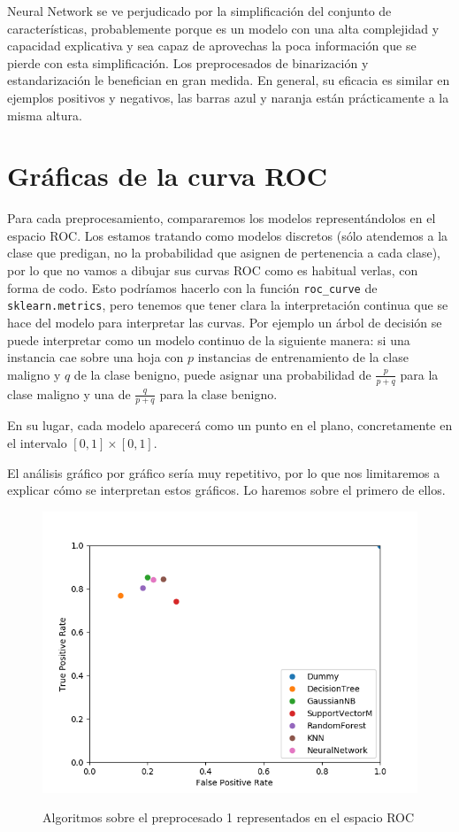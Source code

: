 \documentclass[oneside]{book}
\begin{document}
Neural Network se ve perjudicado por la simplificación del conjunto de
características, probablemente porque es un modelo con una alta
complejidad y capacidad explicativa y sea capaz de aprovechas la poca
información que se pierde con esta simplificación. Los preprocesados
de binarización y estandarización le benefician en gran medida. En
general, su eficacia es similar en ejemplos positivos y negativos, las barras azul y naranja están prácticamente a la misma altura.

\section{Gráficas de la curva ROC}

Para cada preprocesamiento, compararemos los modelos representándolos
en el espacio ROC. Los estamos tratando como modelos discretos (sólo
atendemos a la clase que predigan, no la probabilidad que asignen de
pertenencia a cada clase), por lo que no vamos a dibujar sus curvas
ROC como es habitual verlas, con forma de codo. Esto podríamos hacerlo
con la función \texttt{roc\_curve} de \texttt{sklearn.metrics}, pero
tenemos que tener clara la interpretación continua que se hace del
modelo para interpretar las curvas. Por ejemplo un árbol de decisión
se puede interpretar como un modelo continuo de la siguiente manera:
si una instancia cae sobre una hoja con $p$ instancias de
entrenamiento de la clase maligno y $q$ de la clase benigno, puede
asignar una probabilidad de $\frac{p}{p+q}$ para la clase maligno y
una de $\frac{q}{p+q}$ para la clase benigno.

En su lugar, cada modelo aparecerá como un punto en el plano,
concretamente en el intervalo $[0,1]\times[0,1]$.

El análisis gráfico por gráfico sería muy repetitivo, por lo que nos
limitaremos a explicar cómo se interpretan estos gráficos. Lo haremos
sobre el primero de ellos. \vspace{-3mm}
\begin{figure}[H]
  \centering
  \caption{Algoritmos sobre el preprocesado 1 representados en el espacio ROC}
  \includegraphics[width=120mm]{figures/visualizacion/roc1}
  \label{fig:roc1}
\end{figure}
\end{document}
